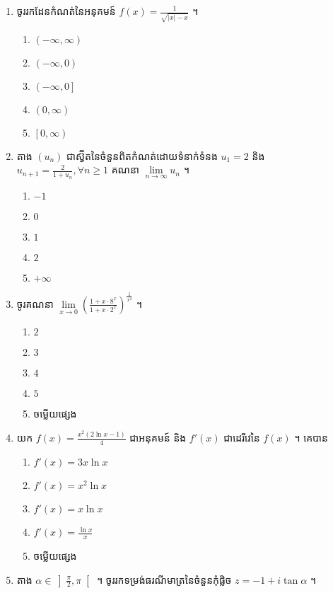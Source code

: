 \documentclass[12pt, a4paper]{article}
\begin{document}
\begin{enumerate}[m]
	\item ចូររកដែនកំណត់នៃអនុគមន៍ $f(x)=\frac{1}{\sqrt{|x|-x}}$ ។
	\begin{enumerate}[k,5] 
		\item $\left(-\infty,\infty\right)$
		\item $\left(-\infty,0\right)$
		\item $\left(-\infty,0\right]$
		\item $\left(0,\infty\right)$
		\item $\left[0,\infty\right)$
	\end{enumerate}
	{\color{blue}\hrulefill}
	\item តាង $\left(u_n\right)$ ជាស្វ៊ីតនៃចំនួនពិតកំណត់ដោយទំនាក់ទំនង $u_1=2$ និង $u_{n+1}=\frac{2}{1+u_n}, \forall n\ge1$ គណនា $\lim\limits_{n\to\infty}u_n$ ។
	\begin{enumerate}[k,5]
		\item $-1$
		\item $0$
		\item $1$
		\item $2$
		\item $+\infty$
	\end{enumerate}
	{\color{blue}\hrulefill}
	\item ចូរគណនា $\lim\limits_{x\to0}\left(\frac{1+x\cdot8^x}{1+x\cdot2^x}\right)^{\frac{1}{x^2}}$ ។
	\begin{enumerate}[k,5]
		\item $2$
		\item $3$
		\item $4$
		\item $5$
		\item ចម្លើយផ្សេង
	\end{enumerate}
	{\color{blue}\hrulefill}
	\item យក $f(x)=\frac{x^2\left(2\ln x-1\right)}{4}$ ជាអនុគមន៍ និង $f'(x)$ ជាដេរីវេនៃ $f(x)$ ។ គេបាន
	\begin{enumerate}[k,5]
		\item $f'(x)=3x\ln x$
		\item $f'(x)=x^2\ln x$
		\item $f'(x)=x\ln x$
		\item $f'(x)=\frac{\ln x}{x}$
		\item ចម្លើយផ្សេង
	\end{enumerate}
	{\color{blue}\hrulefill}
	\item តាង $\alpha\in\left]\frac{\pi}{2},\pi\right[$ ។ ចូររកទម្រង់ធរណីមាត្រនៃចំនួនកុំផ្លិច $z=-1+i\tan\alpha$ ។

\end{enumerate}
\end{document}

